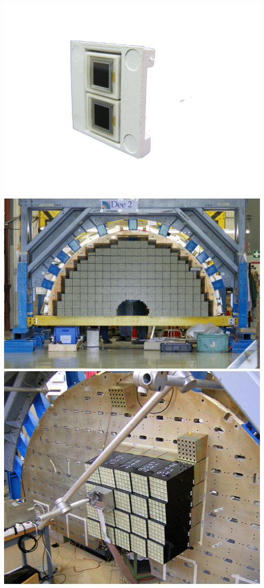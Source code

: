 \begin{itemize}[label=$\bullet$]
	\marginpar
	{
		\includegraphics[width=\marginparwidth]{CMS/APD.png}
		\label{APD}
	}
	\marginpar
	{
		\includegraphics[width=\marginparwidth]{CMS/dee.jpg}
		\label{DEE}
	}
	\marginpar
	{
		\includegraphics[width=\marginparwidth]{CMS/20SCs.jpg}
}
\end{itemize}
